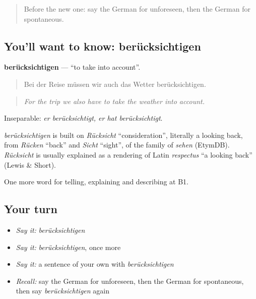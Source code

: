 \begin{quote}
Before the new one: say the German for unforeseen, then the German for spontaneous.
\end{quote}

\subsection*{You'll want to know: berücksichtigen}
\textbf{berücksichtigen} — \textquotedblleft{}to take into account\textquotedblright{}.

\begin{quote}
Bei der Reise müssen wir auch das Wetter berücksichtigen.
\end{quote}

\begin{quote}
\emph{For the trip we also have to take the weather into account.}
\end{quote}

Inseparable: \emph{er berücksichtigt, er hat berücksichtigt}.

\begin{cousinweb}
\emph{berücksichtigen} is built on \emph{Rücksicht} \textquotedblleft{}consideration\textquotedblright{}, literally a looking back, from \emph{Rücken} \textquotedblleft{}back\textquotedblright{} and \emph{Sicht} \textquotedblleft{}sight\textquotedblright{}, of the family of \emph{sehen} (EtymDB). \emph{Rücksicht} is usually explained as a rendering of Latin \emph{respectus} \textquotedblleft{}a looking back\textquotedblright{} (Lewis \& Short).
\end{cousinweb}

\begin{grammarlens}[title={What you've built}]
One more word for telling, explaining and describing at B1.
\end{grammarlens}

\subsection*{Your turn}
\begin{itemize}
\raggedright
  \item \emph{Say it:} \emph{berücksichtigen}
  \item \emph{Say it:} \emph{berücksichtigen}, once more
  \item \emph{Say it:} a sentence of your own with \emph{berücksichtigen}
  \item \emph{Recall:} say the German for unforeseen, then the German for spontaneous, then say \emph{berücksichtigen} again
\end{itemize}

